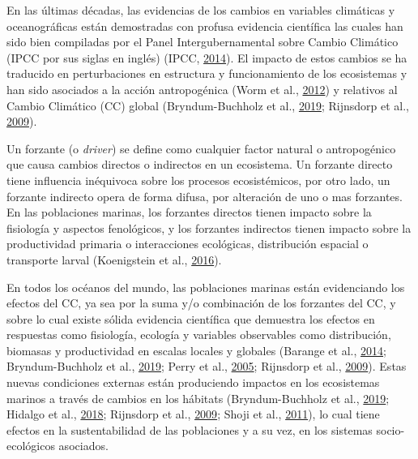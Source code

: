 \documentclass[
]{article}
\begin{document}
En las últimas décadas, las evidencias de los cambios en variables
climáticas y oceanográficas están demostradas con profusa evidencia
científica las cuales han sido bien compiladas por el Panel
Intergubernamental sobre Cambio Climático (IPCC por sus siglas en
inglés) (IPCC, \protect\hyperlink{ref-IPCC2014}{2014}). El impacto de
estos cambios se ha traducido en perturbaciones en estructura y
funcionamiento de los ecosistemas y han sido asociados a la acción
antropogénica (Worm et al., \protect\hyperlink{ref-Worm2012}{2012}) y
relativos al Cambio Climático (CC) global (Bryndum-Buchholz et al.,
\protect\hyperlink{ref-Bryndum-Buchholz2019}{2019}; Rijnsdorp et al.,
\protect\hyperlink{ref-Rijnsdorp2009}{2009}).

Un forzante (o \emph{driver}) se define como cualquier factor natural o
antropogénico que causa cambios directos o indirectos en un ecosistema.
Un forzante directo tiene influencia inéquivoca sobre los procesos
ecosistémicos, por otro lado, un forzante indirecto opera de forma
difusa, por alteración de uno o mas forzantes. En las poblaciones
marinas, los forzantes directos tienen impacto sobre la fisiología y
aspectos fenológicos, y los forzantes indirectos tienen impacto sobre la
productividad primaria o interacciones ecológicas, distribución espacial
o transporte larval (Koenigstein et al.,
\protect\hyperlink{ref-Koenigstein2016}{2016}).

En todos los océanos del mundo, las poblaciones marinas están
evidenciando los efectos del CC, ya sea por la suma y/o combinación de
los forzantes del CC, y sobre lo cual existe sólida evidencia científica
que demuestra los efectos en respuestas como fisiología, ecología y
variables observables como distribución, biomasas y productividad en
escalas locales y globales (Barange et al.,
\protect\hyperlink{ref-Barange2014}{2014}; Bryndum-Buchholz et al.,
\protect\hyperlink{ref-Bryndum-Buchholz2019}{2019}; Perry et al.,
\protect\hyperlink{ref-Perry2005}{2005}; Rijnsdorp et al.,
\protect\hyperlink{ref-Rijnsdorp2009}{2009}). Estas nuevas condiciones
externas están produciendo impactos en los ecosistemas marinos a través
de cambios en los hábitats (Bryndum-Buchholz et al.,
\protect\hyperlink{ref-Bryndum-Buchholz2019}{2019}; Hidalgo et al.,
\protect\hyperlink{ref-Hidalgo2018}{2018}; Rijnsdorp et al.,
\protect\hyperlink{ref-Rijnsdorp2009}{2009}; Shoji et al.,
\protect\hyperlink{ref-Shoji2011}{2011}), lo cual tiene efectos en la
sustentabilidad de las poblaciones y a su vez, en los sistemas
socio-ecológicos asociados.
\end{document}
